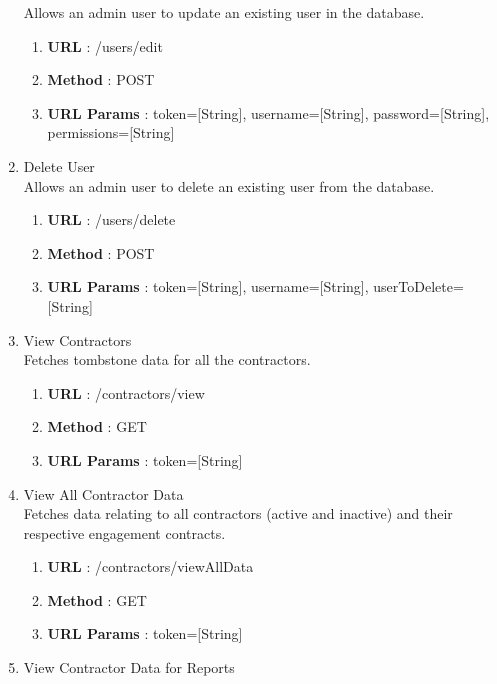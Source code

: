 \documentclass[11pt, titlepage]{article}
\begin{document}
\begin{enumerate}
             Allows an admin user to update an existing user in the database.
                \begin{enumerate}
                    \item \textbf{URL} : /users/edit
                    \item \textbf{Method} : POST
                    \item \textbf{URL Params} : token=[String], username=[String], password=[String], permissions=[String]
                \end{enumerate}
        \item Delete User \\ 
            Allows an admin user to delete an existing user from the database.
                \begin{enumerate}
                    \item \textbf{URL} : /users/delete
                    \item \textbf{Method} : POST
                    \item \textbf{URL Params} : token=[String], username=[String], userToDelete=[String]
                \end{enumerate}
        \item View Contractors \\
             Fetches tombstone data for all the contractors.
                \begin{enumerate}
                    \item \textbf{URL} : /contractors/view
                    \item \textbf{Method} : GET
                    \item \textbf{URL Params} : token=[String]
                \end{enumerate}
        \item View All Contractor Data \\
             Fetches data relating to all contractors (active and inactive) and their respective engagement contracts. 
                \begin{enumerate}
                    \item \textbf{URL} : /contractors/viewAllData
                    \item \textbf{Method} : GET
                    \item \textbf{URL Params} : token=[String]
                \end{enumerate}
        \item View Contractor Data for Reports \\

\end{enumerate}
\end{document}
